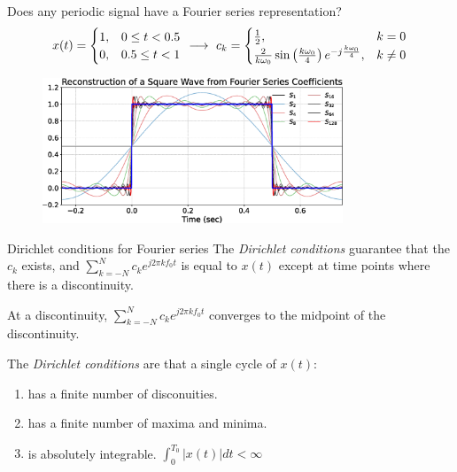 \documentclass[aspectratio=169]{beamer}
\let\olditem\item
\renewcommand{\item}{\setlength{\itemsep}{\fill}\olditem}
\def\lp{\ensuremath\left(}
\def\rp{\ensuremath\right)}
\begin{document}
\begin{frame}[t]{Does any periodic signal have a Fourier series representation?}
\vspace{-0.5cm}
\[ x(t) = \begin{cases} 1, & 0 \leq t < 0.5 \\
0, & 0.5 \leq t < 1\end{cases} \,\, \longrightarrow \,\, c_k = \begin{cases} \frac{1}{2}, & k = 0 \\ \frac{2}{k\omega_0}\sin\lp \frac{k \omega_0}{4} \rp e^{-j\frac{k \omega_0}{4}},  & k \neq 0 \end{cases} \]

\begin{figure}
  \includegraphics[width=0.8\textwidth]{img/fs-sqwave.eps}
  \end{figure}
\end{frame}


\begin{frame}[t]{Dirichlet conditions for Fourier series}
The \textit{Dirichlet conditions} guarantee that the $c_k$ exists, and $\sum_{k=-N}^{N} c_k e^{j2\pi k f_0 t}$ is equal to $x(t)$ except at time points where there is a discontinuity.
\vspace{0.5cm}

At a discontinuity, $\sum_{k=-N}^{N} c_k e^{j2\pi k f_0 t}$ converges to the midpoint of the discontinuity.
\vspace{0.5cm}

The \textit{Dirichlet conditions} are that a single cycle of $x(t)$:
\begin{enumerate}
  \item has a finite number of disconuities.
  \item has a finite number of maxima and minima.
  \item is absolutely integrable.  $\int_{0}^{T_0} \vert x(t) \vert dt < \infty$
\end{enumerate}
\end{frame}
\end{document}
